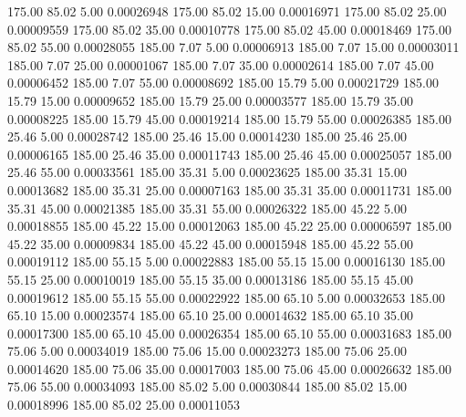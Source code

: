     175.00     85.02      5.00     0.00026948
    175.00     85.02     15.00     0.00016971
    175.00     85.02     25.00     0.00009559
    175.00     85.02     35.00     0.00010778
    175.00     85.02     45.00     0.00018469
    175.00     85.02     55.00     0.00028055
    185.00      7.07      5.00     0.00006913
    185.00      7.07     15.00     0.00003011
    185.00      7.07     25.00     0.00001067
    185.00      7.07     35.00     0.00002614
    185.00      7.07     45.00     0.00006452
    185.00      7.07     55.00     0.00008692
    185.00     15.79      5.00     0.00021729
    185.00     15.79     15.00     0.00009652
    185.00     15.79     25.00     0.00003577
    185.00     15.79     35.00     0.00008225
    185.00     15.79     45.00     0.00019214
    185.00     15.79     55.00     0.00026385
    185.00     25.46      5.00     0.00028742
    185.00     25.46     15.00     0.00014230
    185.00     25.46     25.00     0.00006165
    185.00     25.46     35.00     0.00011743
    185.00     25.46     45.00     0.00025057
    185.00     25.46     55.00     0.00033561
    185.00     35.31      5.00     0.00023625
    185.00     35.31     15.00     0.00013682
    185.00     35.31     25.00     0.00007163
    185.00     35.31     35.00     0.00011731
    185.00     35.31     45.00     0.00021385
    185.00     35.31     55.00     0.00026322
    185.00     45.22      5.00     0.00018855
    185.00     45.22     15.00     0.00012063
    185.00     45.22     25.00     0.00006597
    185.00     45.22     35.00     0.00009834
    185.00     45.22     45.00     0.00015948
    185.00     45.22     55.00     0.00019112
    185.00     55.15      5.00     0.00022883
    185.00     55.15     15.00     0.00016130
    185.00     55.15     25.00     0.00010019
    185.00     55.15     35.00     0.00013186
    185.00     55.15     45.00     0.00019612
    185.00     55.15     55.00     0.00022922
    185.00     65.10      5.00     0.00032653
    185.00     65.10     15.00     0.00023574
    185.00     65.10     25.00     0.00014632
    185.00     65.10     35.00     0.00017300
    185.00     65.10     45.00     0.00026354
    185.00     65.10     55.00     0.00031683
    185.00     75.06      5.00     0.00034019
    185.00     75.06     15.00     0.00023273
    185.00     75.06     25.00     0.00014620
    185.00     75.06     35.00     0.00017003
    185.00     75.06     45.00     0.00026632
    185.00     75.06     55.00     0.00034093
    185.00     85.02      5.00     0.00030844
    185.00     85.02     15.00     0.00018996
    185.00     85.02     25.00     0.00011053
